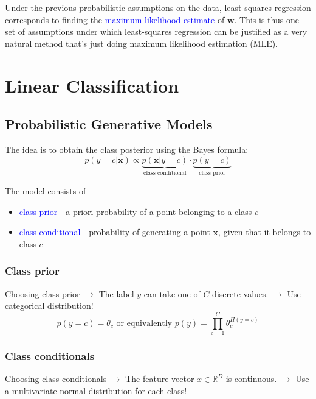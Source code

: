 \documentclass[a4paper,10pt,twoside=true,DIV=10,headsepline,plainheadsepline]{scrartcl}
\begin{document}
Under the previous probabilistic assumptions on the data, least-squares regression corresponds to finding the \textcolor{blue}{maximum likelihood estimate} of $\mathbf{w}$. This is thus one set of assumptions under which least-squares regression can be justified as a very natural method that’s just doing maximum likelihood estimation (MLE).

	\section{Linear Classification}
		\subsection{Probabilistic Generative Models}
		
		The idea is to obtain the class posterior using the Bayes formula:
			\begin{equation}
				p ( y = c | \mathbf{x} ) \propto \underbrace{p ( \mathbf{x} | y = c)}_{\textrm{class conditional}} \cdot \underbrace{p(y = c)}_{\textrm{class prior}}
			\end{equation}

		The model consists of
			\begin{itemize}
 				\item \textcolor{blue}{class prior} - a priori probability of a point belonging to a class $c$
				\item \textcolor{blue}{class conditional} - probability of generating a point $ \mathbf{x}$, given that it belongs to class $c$
			\end{itemize}
		
		\subsubsection{Class prior}
		Choosing class prior $\rightarrow$ The label $y$ can take one of $C$ discrete values. $\rightarrow$ Use categorical distribution!
			\begin{equation}
				p (y = c) = \theta_c \textrm{   or equivalently   } p(y) = \prod^C_{c=1} \theta_c^{\Pi (y = c)}
			\end{equation}

		\subsubsection{Class conditionals}
		Choosing class conditionals $\rightarrow$ The feature vector $x \in \mathbb{R}^D$ is continuous. $\rightarrow$ Use a multivariate normal distribution for each class!
\end{document}
